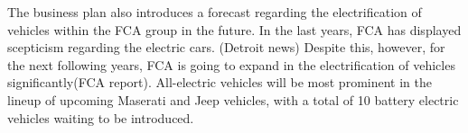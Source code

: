 The business plan also introduces a forecast regarding the electrification of vehicles within the FCA group in the future. In the last years, FCA has displayed scepticism regarding the electric cars. (Detroit news) Despite this, however, for the next following years, FCA is going to expand in the electrification of vehicles significantly(FCA report). All-electric vehicles will be most prominent in the lineup of upcoming Maserati and Jeep vehicles, with a total of 10 battery electric vehicles waiting to be introduced. 
